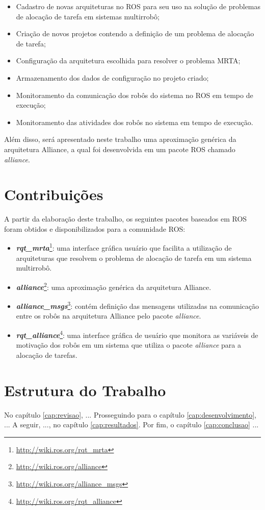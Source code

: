         \begin{itemize}
            \item Cadastro de novas arquiteturas no ROS para seu uso na solução de problemas de alocação de tarefa em sistemas multirrobô;
            \item Criação de novos projetos contendo a definição de um problema de alocação de tarefa;
            \item Configuração da arquitetura escolhida para resolver o problema MRTA;
            \item Armazenamento dos dados de configuração no projeto criado;
            \item Monitoramento da comunicação dos robôs do sistema no ROS em tempo de execução;
            \item Monitoramento das atividades dos robôs no sistema em tempo de execução.
        \end{itemize}
        
        Além disso, será apresentado neste trabalho uma aproximação genérica da arquitetura Alliance, a qual foi desenvolvida em um pacote ROS chamado \textit{alliance}.
        
    \section{Contribuições} \label{sec:contribuicoes}
        A partir da elaboração deste trabalho, os seguintes pacotes baseados em ROS foram obtidos e disponibilizados para a comunidade ROS:
        
        \begin{itemize}
            \item \textbf{\textit{rqt\_mrta}}\footnote{\url{http://wiki.ros.org/rqt_mrta}}: uma interface gráfica usuário que facilita a utilização de arquiteturas que resolvem o problema de alocação de tarefa em um sistema multirrobô.
            \item \textbf{\textit{alliance}}\footnote{\url{http://wiki.ros.org/alliance}}: uma aproximação genérica da arquitetura Alliance.
            \item \textbf{\textit{alliance\_msgs}}\footnote{\url{http://wiki.ros.org/alliance_msgs}}: contém definição das mensagens utilizadas na comunicação entre os robôs na arquitetura Alliance pelo pacote \textit{alliance}.
            \item \textbf{\textit{rqt\_alliance}}\footnote{\url{http://wiki.ros.org/rqt_alliance}}: uma interface gráfica de usuário que monitora as variáveis de motivação dos robôs em um sistema que utiliza o pacote \textit{alliance} para a alocação de tarefas.
        \end{itemize}
    
    \section{Estrutura do Trabalho} \label{sec:estrutura}
        No capítulo \ref{cap:revisao}, ... 
        Prosseguindo para o capítulo \ref{cap:desenvolvimento}, ...
        A seguir, ..., no capítulo \ref{cap:resultados}.
        Por fim, o capítulo \ref{cap:conclusao} ...